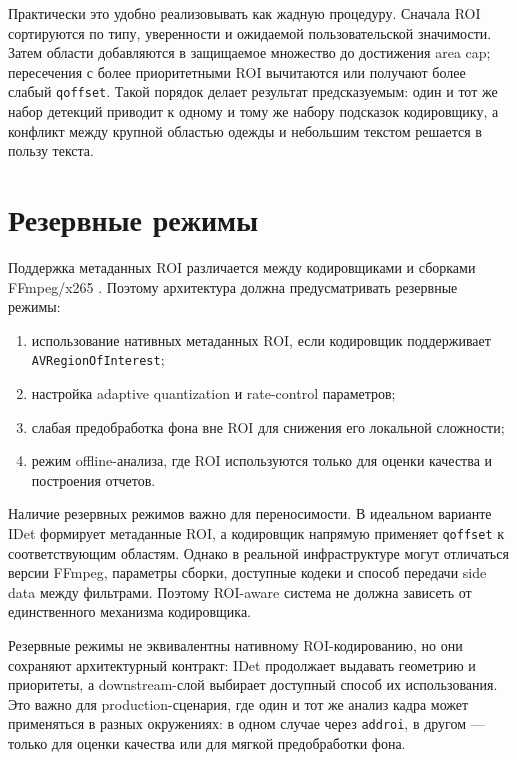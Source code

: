\documentclass[12pt,a4paper,oneside,openany]{report}
\begin{document}
Практически это удобно реализовывать как жадную процедуру. Сначала ROI сортируются по типу,
уверенности и ожидаемой пользовательской значимости. Затем области добавляются в защищаемое
множество до достижения area cap; пересечения с более приоритетными ROI вычитаются или получают
более слабый \texttt{qoffset}. Такой порядок делает результат предсказуемым: один и тот же набор
детекций приводит к одному и тому же набору подсказок кодировщику, а конфликт между крупной
областью одежды и небольшим текстом решается в пользу текста.


\section{Резервные режимы}

Поддержка метаданных ROI различается между кодировщиками и сборками FFmpeg/x265
\cite{ffmpeg_roi,x265}. Поэтому архитектура должна предусматривать резервные режимы:
\begin{enumerate}[label=\arabic*)]
  \item использование нативных метаданных ROI, если кодировщик поддерживает
      \texttt{AVRegionOfInterest};
  \item настройка adaptive quantization и rate-control параметров;
  \item слабая предобработка фона вне ROI для снижения его локальной сложности;
  \item режим offline-анализа, где ROI используются только для оценки качества и построения
      отчетов.
\end{enumerate}

Наличие резервных режимов важно для переносимости. В идеальном варианте IDet формирует
метаданные ROI, а кодировщик напрямую применяет \texttt{qoffset} к соответствующим областям.
Однако в реальной инфраструктуре могут отличаться версии FFmpeg, параметры сборки, доступные
кодеки и способ передачи side data между фильтрами. Поэтому ROI-aware система не должна зависеть
от единственного механизма кодировщика.

Резервные режимы не эквивалентны нативному ROI-кодированию, но они сохраняют архитектурный
контракт: IDet продолжает выдавать геометрию и приоритеты, а downstream-слой выбирает доступный
способ их использования. Это важно для production-сценария, где один и тот же анализ кадра может
применяться в разных окружениях: в одном случае через \texttt{addroi}, в другом --- только для
оценки качества или для мягкой предобработки фона.
\end{document}
